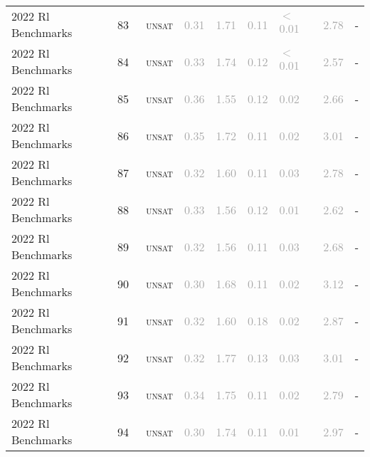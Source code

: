 \begin{center}
{\begin{longtable}{@{}lllllllll@{}}
2022 Rl Benchmarks & 83 & ~\textsc{unsat} & \textcolor{darkgray}{0.31} & \textcolor{darkgray}{1.71} & \textcolor{darkgray}{0.11} & \textcolor{darkgray}{$<$0.01} & \textcolor{darkgray}{2.78} & - \\
2022 Rl Benchmarks & 84 & ~\textsc{unsat} & \textcolor{darkgray}{0.33} & \textcolor{darkgray}{1.74} & \textcolor{darkgray}{0.12} & \textcolor{darkgray}{$<$0.01} & \textcolor{darkgray}{2.57} & - \\
2022 Rl Benchmarks & 85 & ~\textsc{unsat} & \textcolor{darkgray}{0.36} & \textcolor{darkgray}{1.55} & \textcolor{darkgray}{0.12} & \textcolor{darkgray}{0.02} & \textcolor{darkgray}{2.66} & - \\
2022 Rl Benchmarks & 86 & ~\textsc{unsat} & \textcolor{darkgray}{0.35} & \textcolor{darkgray}{1.72} & \textcolor{darkgray}{0.11} & \textcolor{darkgray}{0.02} & \textcolor{darkgray}{3.01} & - \\
2022 Rl Benchmarks & 87 & ~\textsc{unsat} & \textcolor{darkgray}{0.32} & \textcolor{darkgray}{1.60} & \textcolor{darkgray}{0.11} & \textcolor{darkgray}{0.03} & \textcolor{darkgray}{2.78} & - \\
2022 Rl Benchmarks & 88 & ~\textsc{unsat} & \textcolor{darkgray}{0.33} & \textcolor{darkgray}{1.56} & \textcolor{darkgray}{0.12} & \textcolor{darkgray}{0.01} & \textcolor{darkgray}{2.62} & - \\
2022 Rl Benchmarks & 89 & ~\textsc{unsat} & \textcolor{darkgray}{0.32} & \textcolor{darkgray}{1.56} & \textcolor{darkgray}{0.11} & \textcolor{darkgray}{0.03} & \textcolor{darkgray}{2.68} & - \\
2022 Rl Benchmarks & 90 & ~\textsc{unsat} & \textcolor{darkgray}{0.30} & \textcolor{darkgray}{1.68} & \textcolor{darkgray}{0.11} & \textcolor{darkgray}{0.02} & \textcolor{darkgray}{3.12} & - \\
2022 Rl Benchmarks & 91 & ~\textsc{unsat} & \textcolor{darkgray}{0.32} & \textcolor{darkgray}{1.60} & \textcolor{darkgray}{0.18} & \textcolor{darkgray}{0.02} & \textcolor{darkgray}{2.87} & - \\
2022 Rl Benchmarks & 92 & ~\textsc{unsat} & \textcolor{darkgray}{0.32} & \textcolor{darkgray}{1.77} & \textcolor{darkgray}{0.13} & \textcolor{darkgray}{0.03} & \textcolor{darkgray}{3.01} & - \\
2022 Rl Benchmarks & 93 & ~\textsc{unsat} & \textcolor{darkgray}{0.34} & \textcolor{darkgray}{1.75} & \textcolor{darkgray}{0.11} & \textcolor{darkgray}{0.02} & \textcolor{darkgray}{2.79} & - \\
2022 Rl Benchmarks & 94 & ~\textsc{unsat} & \textcolor{darkgray}{0.30} & \textcolor{darkgray}{1.74} & \textcolor{darkgray}{0.11} & \textcolor{darkgray}{0.01} & \textcolor{darkgray}{2.97} & - \\

\end{longtable}}
\end{center}
